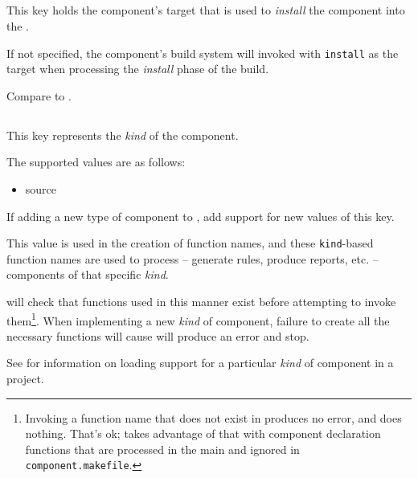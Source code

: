 \subsection{}\label{variables:install-target}

This key holds the component's \makefile target that is used to
\emph{install} the component into the \destdir.

If not specified, the component's build system will invoked with
\texttt{install} as the target when processing the \emph{install}
phase of the build.

Compare to .


\subsection{}\label{variables:kind}

This key represents the \emph{kind} of the component.

The supported values are as follows:

\begin{itemize}
\item source
\end{itemize}

If adding a new type of component to \lmsbw, add support for new
values of this key.

This value is used in the creation of function names, and these
\texttt{kind}-based function names are used to process -- generate
rules, produce reports, etc. -- components of that specific
\emph{kind}.

\lmsbw will check that functions used in this manner exist before
attempting to invoke them\footnote{Invoking a function name that does
  not exist in \gnumake produces no error, and does nothing.  That's
  ok; \lmsbw takes advantage of that with component declaration
  functions that are processed in the main \makefile and ignored in
  \texttt{component.makefile}.}.  When implementing a new \emph{kind}
of component, failure to create all the necessary functions will cause
\lmsbw will produce an error and stop.

See  for information on
loading support for a particular \emph{kind} of component in a
project.


